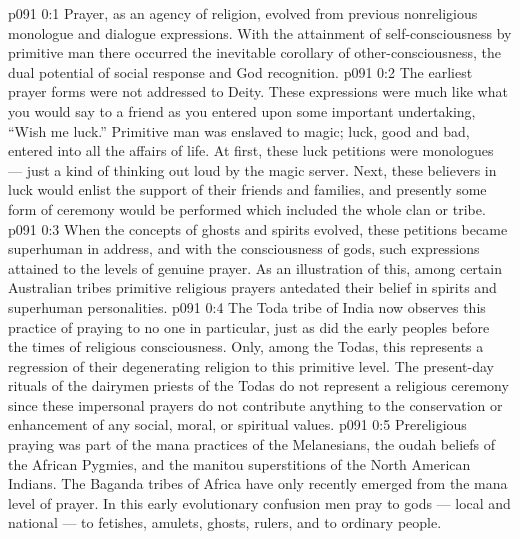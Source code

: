 \author{Chief of Midwayers}
\vs p091 0:1 Prayer, as an agency of religion, evolved from previous nonreligious monologue and dialogue expressions. With the attainment of self\hyp{}consciousness by primitive man there occurred the inevitable corollary of other\hyp{}consciousness, the dual potential of social response and God recognition.
\vs p091 0:2 The earliest prayer forms were not addressed to Deity. These expressions were much like what you would say to a friend as you entered upon some important undertaking, “Wish me luck.” Primitive man was enslaved to magic; luck, good and bad, entered into all the affairs of life. At first, these luck petitions were monologues --- just a kind of thinking out loud by the magic server. Next, these believers in luck would enlist the support of their friends and families, and presently some form of ceremony would be performed which included the whole clan or tribe.
\vs p091 0:3 When the concepts of ghosts and spirits evolved, these petitions became superhuman in address, and with the consciousness of gods, such expressions attained to the levels of genuine prayer. As an illustration of this, among certain Australian tribes primitive religious prayers antedated their belief in spirits and superhuman personalities.
\vs p091 0:4 The Toda tribe of India now observes this practice of praying to no one in particular, just as did the early peoples before the times of religious consciousness. Only, among the Todas, this represents a regression of their degenerating religion to this primitive level. The present\hyp{}day rituals of the dairymen priests of the Todas do not represent a religious ceremony since these impersonal prayers do not contribute anything to the conservation or enhancement of any social, moral, or spiritual values.
\vs p091 0:5 Prereligious praying was part of the mana practices of the Melanesians, the oudah beliefs of the African Pygmies, and the manitou superstitions of the North American Indians. The Baganda tribes of Africa have only recently emerged from the mana level of prayer. In this early evolutionary confusion men pray to gods --- local and national --- to fetishes, amulets, ghosts, rulers, and to ordinary people.
